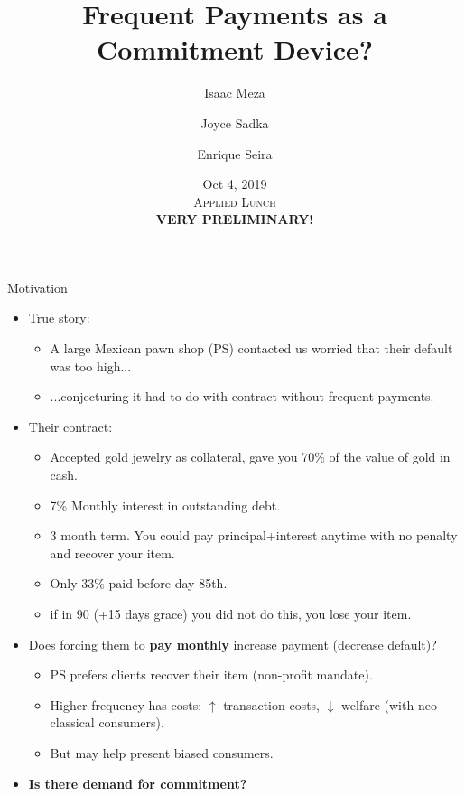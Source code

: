 \documentclass[9pt]{beamer}
\begin{document}
\title{Frequent Payments as a Commitment Device?}


\author[]{
Isaac Meza\and Joyce Sadka  \and Enrique Seira}


\date{Oct 4, 2019\\\;\;\textsc{Applied Lunch}\\\;\;\textbf{\alert{VERY PRELIMINARY!} }}


\begin{frame}[c, noframenumbering]%
\titlepage
\end{frame}


\begin{frame}{Motivation}
\begin{itemize}
\vfill \item True story:
    \begin{itemize}
        \item A large Mexican pawn shop (PS) contacted us worried that their default was too high...
        \item ...conjecturing it had to do with contract without frequent payments.
    \end{itemize}
    \pause
\vfill \item Their contract:
    \begin{itemize}
        \item Accepted gold jewelry as collateral, gave you 70\% of the value of gold in cash.
        \item 7\% Monthly interest in outstanding debt.
        \item 3 month term. You could pay principal+interest anytime with no penalty and recover your item. 
        \item Only 33\% paid before day 85th.
        \item if in 90 (+15 days grace) you did not do this, you lose your item.
    \end{itemize}
    \pause
\vfill \item Does forcing them to \textbf{pay monthly} increase payment (decrease default)?
    \begin{itemize}
        \item PS prefers clients recover their item (non-profit mandate).
        \item Higher frequency has costs: $\uparrow$ transaction costs, $\downarrow$  welfare (with neo-classical consumers).
        \item But may help present biased consumers. 
    \end{itemize}
    \vfill
    \pause
    \item \textbf{Is there demand for commitment?}
\end{itemize}
\vfill
\end{frame}
\end{document}
